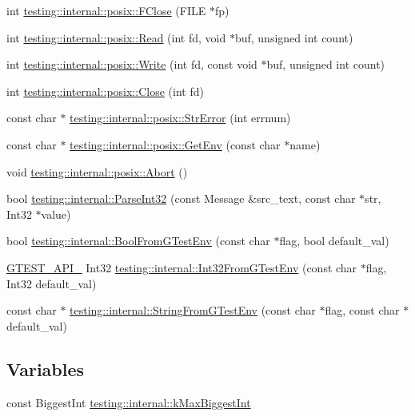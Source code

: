 \begin{DoxyCompactItemize}
\item 
int \hyperlink{namespacetesting_1_1internal_1_1posix_af4beeaaa8d62916d5e3b644a1ddfbd6b}{testing\+::internal\+::posix\+::\+F\+Close} (F\+I\+L\+E $\ast$fp)
\item 
int \hyperlink{namespacetesting_1_1internal_1_1posix_a3c6ab13e581a56f1b02f3eb7536c97fd}{testing\+::internal\+::posix\+::\+Read} (int fd, void $\ast$buf, unsigned int count)
\item 
int \hyperlink{namespacetesting_1_1internal_1_1posix_af4acf9f78d55f815a18b43786511abef}{testing\+::internal\+::posix\+::\+Write} (int fd, const void $\ast$buf, unsigned int count)
\item 
int \hyperlink{namespacetesting_1_1internal_1_1posix_a15e5b8f2a535ef1b2529b85b861e4846}{testing\+::internal\+::posix\+::\+Close} (int fd)
\item 
const char $\ast$ \hyperlink{namespacetesting_1_1internal_1_1posix_a4b77b14af6f4d18f83d303b98e9349c4}{testing\+::internal\+::posix\+::\+Str\+Error} (int errnum)
\item 
const char $\ast$ \hyperlink{namespacetesting_1_1internal_1_1posix_a1d5e3da5a27eed25986859fa83cafe95}{testing\+::internal\+::posix\+::\+Get\+Env} (const char $\ast$name)
\item 
void \hyperlink{namespacetesting_1_1internal_1_1posix_a69b8278c59359dd6a6f941b4643db9fb}{testing\+::internal\+::posix\+::\+Abort} ()
\item 
bool \hyperlink{namespacetesting_1_1internal_ac06fc81336a3d80755f4020d34321766}{testing\+::internal\+::\+Parse\+Int32} (const Message \&src\+\_\+text, const char $\ast$str, Int32 $\ast$value)
\item 
bool \hyperlink{namespacetesting_1_1internal_a67132cdce23fb71b6c38ee34ef81eb4c}{testing\+::internal\+::\+Bool\+From\+G\+Test\+Env} (const char $\ast$flag, bool default\+\_\+val)
\item 
\hyperlink{gtest-port_8h_aa73be6f0ba4a7456180a94904ce17790}{G\+T\+E\+S\+T\+\_\+\+A\+P\+I\+\_\+} Int32 \hyperlink{namespacetesting_1_1internal_a227ce16736a6992fcd13ac3cd23ef1f1}{testing\+::internal\+::\+Int32\+From\+G\+Test\+Env} (const char $\ast$flag, Int32 default\+\_\+val)
\item 
const char $\ast$ \hyperlink{namespacetesting_1_1internal_a72099045bb72303860b2138658a5f6ee}{testing\+::internal\+::\+String\+From\+G\+Test\+Env} (const char $\ast$flag, const char $\ast$default\+\_\+val)
\end{DoxyCompactItemize}
\subsection*{Variables}
\begin{DoxyCompactItemize}
\item 
const Biggest\+Int \hyperlink{namespacetesting_1_1internal_ad901880198832bc166d2493096b451f7}{testing\+::internal\+::k\+Max\+Biggest\+Int}
\end{DoxyCompactItemize}


